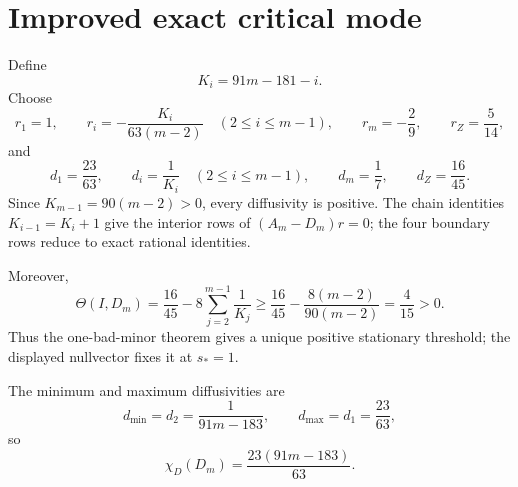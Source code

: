 \section*{Improved exact critical mode}
Define
\[
K_i=91m-181-i.
\]
Choose
\[
r_1=1,
\qquad
r_i=-\frac{K_i}{63(m-2)}\quad(2\le i\le m-1),
\qquad
r_m=-\frac29,
\qquad
r_Z=\frac5{14},
\]
and
\[
d_1=\frac{23}{63},
\qquad
d_i=\frac1{K_i}\quad(2\le i\le m-1),
\qquad
d_m=\frac17,
\qquad
d_Z=\frac{16}{45}.
\]
Since $K_{m-1}=90(m-2)>0$, every diffusivity is positive.  The chain identities
$K_{i-1}=K_i+1$ give the interior rows of $(A_m-D_m)r=0$; the four boundary
rows reduce to exact rational identities.

Moreover,
\[
\Theta(I,D_m)=\frac{16}{45}-8\sum_{j=2}^{m-1}\frac1{K_j}
\ge \frac{16}{45}-\frac{8(m-2)}{90(m-2)}=\frac4{15}>0.
\]
Thus the one-bad-minor theorem gives a unique positive stationary threshold;
the displayed nullvector fixes it at $s_*=1$.

The minimum and maximum diffusivities are
\[
d_{\min}=d_2=\frac1{91m-183},
\qquad
d_{\max}=d_1=\frac{23}{63},
\]
so
\[
\boxed{\chi_D(D_m)=\frac{23(91m-183)}{63}.}
\]
